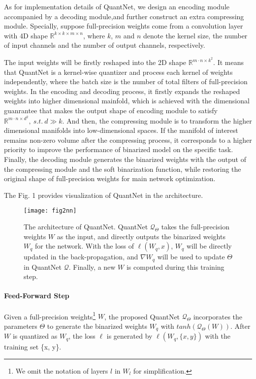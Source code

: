 \documentclass[runningheads]{llncs}
\begin{document}
As for implementation details of QuantNet,
we design an encoding module accompanied by a decoding module,and further construct an extra compressing module. Specially, suppose full-precision weights come from a convolution layer
with 4D shape $\mathbb{R}^{k \times k \times m \times n}$,
where $k$, $m$ and $n$ denote the kernel size, the number of input channels and the number of output channels, respectively.

The input weights will be firstly reshaped into the 2D shape $\mathbb{R}^{m \cdot n \times k^2}$.
It means that QuantNet is a kernel-wise quantizer and process each kernel of weights independently,
where the batch size is the number of total filters of full-precision weights.
In the encoding and decoding process, it firstly expands the reshaped weights into higher dimensional mainfold,
which is achieved with the dimensional guanrantee that makes
the output shape of encoding module to satisfy $\mathbb{R}^{m \cdot n \times d^2}, \ s.t. \ d \gg k$.
And then, the compressing module is to transform the higher dimensional manifolds into low-dimensional spaces.
If the manifold of interest remains non-zero volume after the compressing process,
it corresponds to a higher priority to improve the performance of binarized model on the specific task.
Finally, the decoding module generates the binarized weights
with the output of the compressing module and the soft binarization function,
while restoring the original shape of full-precision weights for main network optimization.

The Fig. 1 provides visualization of QuantNet in the architecture.

\begin{figure}[t]
  \centering
  \texttt{[image: fig2nn]}
  \caption{The architecture of QuantNet. QuantNet $\mathcal{Q}_{\Theta}$ takes the full-precision weights $W$ as the input, and directly outputs the binarized weights $W_q$ for the network. With the loss of $\ell(W_q, x)$,  $W_q$ will be directly updated in the back-propagation, and $\nabla W_q$ will be used to update $\Theta$ in QuantNet $\mathcal{Q}$. Finally, a new $W$ is computed during this training step.}\label{fig:QuanNet}
\end{figure}

\paragraph{\textbf{Feed-Forward Step}}
Given a full-precision weights\footnote{We omit the notation of layers $l$ in $W_l$ for simplification.} $W$,
the proposed QuantNet $\mathcal{Q}_{\Theta}$ incorporates the parameters $\Theta$
to generate the binarized weights $W_q$ with $tanh(\mathcal{Q}_{\Theta}(W))$.
After $W$ is quantized as $W_q$, the loss $\ell$ is generated by $\ell(W_q, \{x, y\})$ with the training set \{x, y\}.
\end{document}
